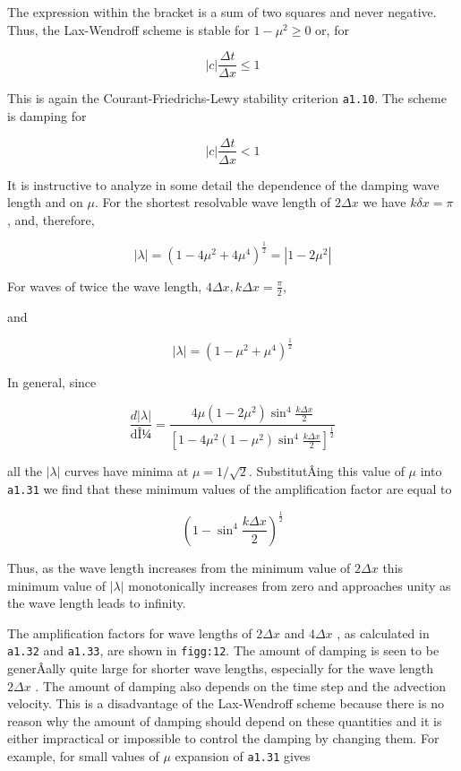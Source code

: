 The expression within the bracket is a sum of two squares and never
negative. Thus, the Lax-Wendroff scheme is stable for
\(1 - \mu^{2} \geq 0\) or, for

\[\left| c \right|\frac{\Delta t}{\Delta x} \leq 1\]

This is again the Courant-Friedrichs-Lewy stability criterion
\texttt{a1.10}. The scheme is damping for

\[\left| c  \right|\frac{\Delta t}{\Delta x} < 1\]

It is instructive to analyze in some detail the dependence of the
damping wave length and on \(\mu\). For the shortest resolvable wave
length of \(2\Delta x\) we have \(k\delta x = \pi\) , and, therefore,

{\[|\lambda|  = \left( 1 - 4\mu^{2} + 4\mu^{4} \right)^{\frac{1}{2}} = \left| 1 - 2\mu^{2} \right|\]}

For waves of twice the wave length,
\(4\Delta x,k\Delta x = \frac{\pi}{2}\),

and

{\[|\lambda| = \left( 1 - \mu^{2} + \mu^{4} \right)^{\frac{1}{2}}\]}

In general, since

\[\frac{d|\lambda|}{\text{dÎ¼}} = \frac{4\mu\left( 1 - 2\mu^{2} \right)\sin^{4}\frac{k\Delta x}{2}}{\left\lbrack 1 - 4\mu^{2}\left( 1 - \mu^{2} \right)\sin^{4}\frac{k\Delta x}{2} \right\rbrack^{\frac{1}{2}}}\]

all the \(|\lambda|\) curves have minima at \(\mu = 1/\sqrt{2}\).
SubstitutÂ­ing this value of \(\mu\) into \texttt{a1.31} we find that
these minimum values of the amplification factor are equal to

{\[\left( 1 - \sin^{4}\frac{k\Delta x}{2} \right)^{\frac{1}{2}}\]}

Thus, as the wave length increases from the minimum value of
\(2\Delta x\) this minimum value of \(|\lambda|\) monotonically
increases from zero and approaches unity as the wave length leads to
infinity.

The amplification factors for wave lengths of \(2\Delta x\) and
\(4\Delta x\) , as calculated in \texttt{a1.32} and \texttt{a1.33}, are
shown in \texttt{figg:12}. The amount of damping is seen to be
generÂ­ally quite large for shorter wave lengths, especially for the wave
length \(2\Delta x\) . The amount of damping also depends on the time
step and the advection velocity. This is a disadvantage of the
Lax-Wendroff scheme because there is no reason why the amount of damping
should depend on these quantities and it is either impractical or
impossible to control the damping by changing them. For example, for
small values of \(\mu\) expansion of \texttt{a1.31} gives

